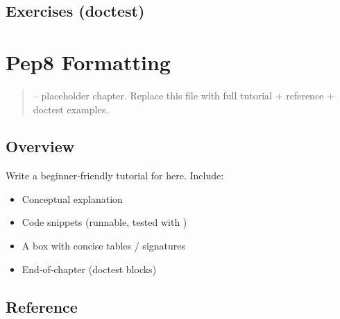 \documentclass[a4paper,11pt,english]{sphinxmanual}
\begin{document}
\subsection{Exercises (doctest)}
\label{\detokenize{best_practices/documentation:exercises-doctest}}
\begin{sphinxVerbatim}[commandchars=\\\{\}]
\end{sphinxVerbatim}

\sphinxstepscope


\section{Pep8 Formatting}
\label{\detokenize{best_practices/pep8_formatting:pep8-formatting}}\label{\detokenize{best_practices/pep8_formatting::doc}}\begin{quote}

\sphinxAtStartPar
{} – placeholder chapter. Replace this file with full tutorial + reference + doctest examples.
\end{quote}


\subsection{Overview}
\label{\detokenize{best_practices/pep8_formatting:overview}}
\sphinxAtStartPar
Write a beginner‑friendly tutorial for  here. Include:
\begin{itemize}
\item {} 
\sphinxAtStartPar
Conceptual explanation

\item {} 
\sphinxAtStartPar
Code snippets (runnable, tested with )

\item {} 
\sphinxAtStartPar
A  box with concise tables / signatures

\item {} 
\sphinxAtStartPar
End‑of‑chapter  (doctest blocks)

\end{itemize}


\subsection{Reference}
\label{\detokenize{best_practices/pep8_formatting:reference}}
\end{document}
